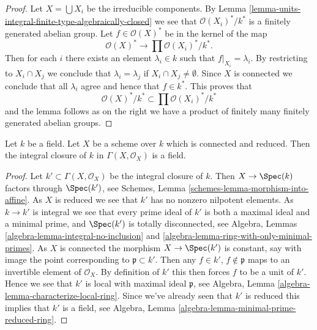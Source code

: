 \begin{proof}
Let $X = \bigcup X_i$ be the irreducible components. By
Lemma \ref{lemma-units-integral-finite-type-algebraically-closed}
we see that $\mathcal{O}(X_i)^*/k^*$ is a finitely generated
abelian group. Let $f \in \mathcal{O}(X)^*$ be in the kernel
of the map
$$
\mathcal{O}(X)^* \longrightarrow \prod \mathcal{O}(X_i)^*/k^*.
$$
Then for each $i$ there exists an element $\lambda_i \in k$
such that $f|_{X_i} = \lambda_i$.
By restricting to $X_i \cap X_j$ we conclude that
$\lambda_i = \lambda_j$ if $X_i \cap X_j \not = \emptyset$.
Since $X$ is connected we conclude that all $\lambda_i$ agree
and hence that $f \in k^*$. This proves that
$$
\mathcal{O}(X)^*/k^* \subset \prod \mathcal{O}(X_i)^*/k^*
$$
and the lemma follows as on the right we have a product of finitely
many finitely generated abelian groups.
\end{proof}

\begin{lemma}
\label{lemma-integral-closure-ground-field}
Let $k$ be a field.
Let $X$ be a scheme over $k$ which is connected and reduced.
Then the integral closure of $k$ in $\Gamma(X, \mathcal{O}_X)$
is a field.
\end{lemma}

\begin{proof}
Let $k' \subset \Gamma(X, \mathcal{O}_X)$ be the integral closure of
$k$. Then $X \to \Spec(k)$ factors through $\Spec(k')$, see
Schemes, Lemma \ref{schemes-lemma-morphism-into-affine}.
As $X$ is reduced we see that $k'$ has no nonzero nilpotent elements.
As $k \to k'$ is integral we see that every prime ideal of $k'$ is
both a maximal ideal and a minimal prime,
and $\Spec(k')$ is totally disconnected, see
Algebra, Lemmas \ref{algebra-lemma-integral-no-inclusion} and
\ref{algebra-lemma-ring-with-only-minimal-primes}.
As $X$ is connected the morphism $X \to \Spec(k')$ is
constant, say with image the point corresponding to
$\mathfrak p \subset k'$. Then any $f \in k'$, $f \not \in \mathfrak p$
maps to an invertible element of $\mathcal{O}_X$. By definition
of $k'$ this then forces $f$ to be a unit of $k'$. Hence we see
that $k'$ is local with maximal ideal $\mathfrak p$, see
Algebra, Lemma \ref{algebra-lemma-characterize-local-ring}.
Since we've already seen that $k'$ is reduced this implies that
$k'$ is a field, see
Algebra, Lemma \ref{algebra-lemma-minimal-prime-reduced-ring}.
\end{proof}

